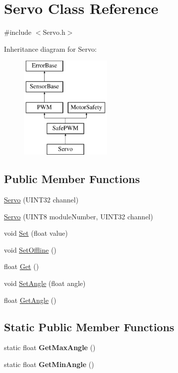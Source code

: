 \hypertarget{classServo}{
\section{Servo Class Reference}
\label{classServo}
}


{\ttfamily \#include $<$Servo.h$>$}

Inheritance diagram for Servo:\begin{figure}[H]
\begin{center}
\leavevmode
\includegraphics[height=5.000000cm]{classServo}
\end{center}
\end{figure}
\subsection*{Public Member Functions}
\begin{DoxyCompactItemize}
\item 
\hyperlink{classServo_ac28728fe000cd4e1fbe37c7471c6ed42}{Servo} (UINT32 channel)
\item 
\hyperlink{classServo_a3724431be0be92edb3a533a54f4b7909}{Servo} (UINT8 moduleNumber, UINT32 channel)
\item 
void \hyperlink{classServo_a9ab93d2e70c8be9d2599aa225a6f8610}{Set} (float value)
\item 
void \hyperlink{classServo_ab151adcbbabc49c1bbe41ec349f17c23}{SetOffline} ()
\item 
float \hyperlink{classServo_a5ecdde666455fa3c20d4ae1b6184a047}{Get} ()
\item 
void \hyperlink{classServo_a0046f9431e42de3fe63f8ce1b3995eb5}{SetAngle} (float angle)
\item 
float \hyperlink{classServo_a0ccee0191f0026d94db4646e6662700c}{GetAngle} ()
\end{DoxyCompactItemize}
\subsection*{Static Public Member Functions}
\begin{DoxyCompactItemize}
\item 
\hypertarget{classServo_ae36a37bed39b8f1eef52504835691c3a}{
static float {\bfseries GetMaxAngle} ()}
\label{classServo_ae36a37bed39b8f1eef52504835691c3a}

\item 
\hypertarget{classServo_a5f278b3f0f6d99e4c3fd74ded31f8b93}{
static float {\bfseries GetMinAngle} ()}
\label{classServo_a5f278b3f0f6d99e4c3fd74ded31f8b93}

\end{DoxyCompactItemize}



